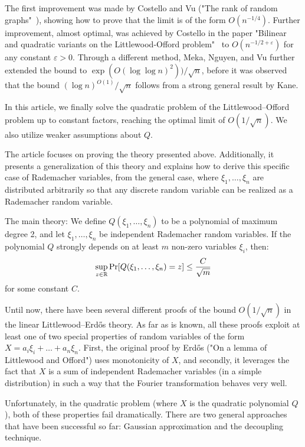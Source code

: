 The first improvement was made by Costello and Vu ("The rank of random graphs"~\cite{costello2008rank}), showing how to prove that the limit is of the form $O(n^{-1/4})$. Further improvement, almost optimal, was achieved by Costello in the paper "Bilinear and quadratic variants on the Littlewood-Offord problem"~\cite{costello2009bilinear} to $O(n^{-1/2+\varepsilon})$ for any constant $\varepsilon > 0$. Through a different method, Meka, Nguyen, and Vu further extended the bound to $\exp(O(\log\log n)^2))/\sqrt{n}$, before it was observed that the bound $(\log n)^{O(1)}/\sqrt{n}$ follows from a strong general result by Kane.
 
In this article, we finally solve the quadratic problem of the Littlewood–Offord problem up to constant factors, reaching the optimal limit of $O(1/\sqrt{n})$. We also utilize weaker assumptions about $Q$.
 
The article focuses on proving the theory presented above. Additionally, it presents a generalization of this theory and explains how to derive this specific case of Rademacher variables, from the general case, where $\xi_1,\ldots,\xi_n$ are distributed arbitrarily so that any discrete random variable can be realized as a Rademacher random variable.
 
The main theory: We define $Q(\xi_1,\ldots,\xi_n)$ to be a polynomial of maximum degree 2, and let $\xi_1,\ldots,\xi_n$ be independent Rademacher random variables. If the polynomial $Q$ strongly depends on at least $m$ non-zero variables $\xi_i$, then:
\vspace{-0.36\baselineskip}
\[ \sup_{z\in\mathbb{R}} \Pr[Q(\xi_1,\ldots,\xi_n) = z] \leq \frac{C}{\sqrt{m}} \vspace{-0.5\baselineskip} \] for some constant $C$.
 
Until now, there have been several different proofs of the bound $O(1/\sqrt{n})$ in the linear Littlewood–Erdős theory. As far as is known, all these proofs exploit at least one of two special properties of random variables of the form $X = a_i \xi_i + \ldots + a_n \xi_n$. First, the original proof by Erdős ("On a lemma of Littlewood and Offord") uses monotonicity of $X$, and secondly, it leverages the fact that $X$ is a sum of independent Rademacher variables (in a simple distribution) in such a way that the Fourier transformation behaves very well.
 
Unfortunately, in the quadratic problem (where $X$ is the quadratic polynomial $Q$), both of these properties fail dramatically. There are two general approaches that have been successful so far: Gaussian approximation and the decoupling technique.
 

